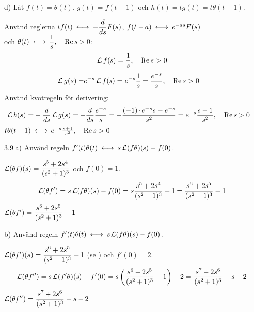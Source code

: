 \begin{task}{d)}
	Låt $f(t)=\theta(t)$, $g(t)=f(t-1)$ och $h(t)=tg(t)=t\theta(t-1)$.
	
	Använd reglerna $tf(t) \llra -\dfrac{d}{ds}F(s)$, $f(t-a)\llra e^{-as}F(s)$ \\
	och $\theta(t)\llra\dfrac{1}{s}\cond{\Re s > 0}$:
	\[\operatorname{\mathcal{L}} f(s)=\frac{1}{s}, \quad \operatorname{Re} s > 0\]
	\begin{align*}
	\operatorname{\mathcal{L}} g(s)=
	&e^{-s}\operatorname{\mathcal{L}} f(s)=
	e^{-s}\frac{1}{s}=
	\frac{e^{-s}}{s}, \quad \operatorname{Re} s > 0
	\end{align*}
	Använd kvotregeln för derivering:
	\begin{align*}
	\operatorname{\mathcal{L}} h(s)=
	&-\frac{d}{ds}\operatorname{\mathcal{L}} g(s)=
	-\frac{d}{ds}\frac{e^{-s}}{s}=
	-\frac{(-1)\operatorname{\cdot}e^{-s}s-e^{-s}}{s^2}=
	e^{-s}\frac{s+1}{s^2}, \quad \operatorname{Re} s > 0
	\end{align*}
	\ans $t\theta(t-1) \llra e^{-s}\frac{s+1}{s^2}\cond{\Re s > 0}$
\end{task}

\begin{task}{3.9 a)}
	Använd regeln $f'(t)\theta(t)\llra s\laplace(f\theta)(s)-f(0)$.
	
	$\operatorname{\mathcal{L}}(\theta f)(s)=\dfrac{s^5+2s^4}{(s^2+1)^3}$ och $f(0)=1$.
	\begin{align*}
	\operatorname{\mathcal{L}}(\theta f')=
	s\operatorname{\mathcal{L}}(f\theta)(s)-f(0)=
	s\frac{s^5+2s^4}{(s^2+1)^3}-1=
	\frac{s^6+2s^5}{(s^2+1)^3}-1
	\end{align*}
	\ans $\operatorname{\mathcal{L}}(\theta f')=\dfrac{s^6+2s^5}{(s^2+1)^3}-1$
\end{task}

\begin{task}{b)}
	Använd regeln $f'(t)\theta(t)\llra s\laplace(f\theta)(s)-f(0)$.
	
	$\operatorname{\mathcal{L}}(\theta f')(s)=\dfrac{s^6+2s^5}{(s^2+1)^3}-1$ (se ) och $f'(0)=2$.
	\begin{align*}
	\operatorname{\mathcal{L}}(\theta f'')=
	s\operatorname{\mathcal{L}}(f'\theta)(s)-f'(0)=
	s\left(\frac{s^6+2s^5}{(s^2+1)^3}-1\right)-2=
	\frac{s^7+2s^6}{(s^2+1)^3}-s-2
	\end{align*}
	\ans $\operatorname{\mathcal{L}}(\theta f'')=\dfrac{s^7+2s^6}{(s^2+1)^3}-s-2$
\end{task}